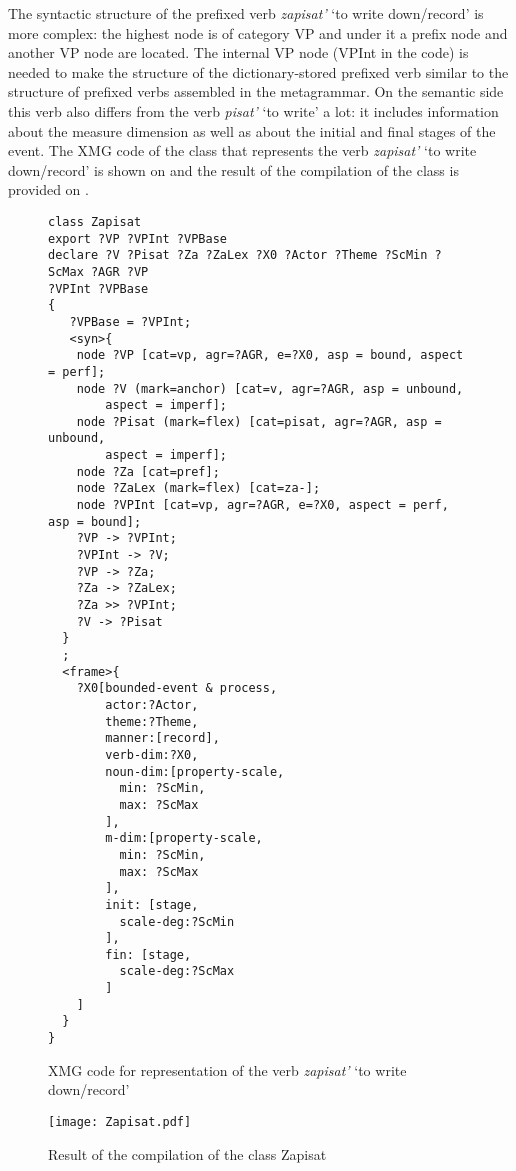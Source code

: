The syntactic structure of the prefixed verb \textit{zapisat'} `to write down/record' is more complex: the highest node is of category VP and under it a prefix node and another VP node are located. The internal VP node (VPInt in the code) is needed to make the structure of the dictionary-stored prefixed verb similar to the structure of prefixed verbs assembled in the metagrammar. On the semantic side this verb also differs from the verb \textit{pisat'} `to write' a lot: it includes information about the measure dimension as well as about the initial and final stages of the event. The XMG code of the class that represents the verb \textit{zapisat'} `to write down/record' is shown on  and the result of the compilation of the class is provided on .
 
 \begin{figure}\small
\begin{verbatim}
class Zapisat
export ?VP ?VPInt ?VPBase
declare ?V ?Pisat ?Za ?ZaLex ?X0 ?Actor ?Theme ?ScMin ?ScMax ?AGR ?VP 
?VPInt ?VPBase
{
   ?VPBase = ?VPInt;
   <syn>{
    node ?VP [cat=vp, agr=?AGR, e=?X0, asp = bound, aspect = perf];
    node ?V (mark=anchor) [cat=v, agr=?AGR, asp = unbound, 
    	aspect = imperf];
    node ?Pisat (mark=flex) [cat=pisat, agr=?AGR, asp = unbound, 
    	aspect = imperf];
    node ?Za [cat=pref];
    node ?ZaLex (mark=flex) [cat=za-];
    node ?VPInt [cat=vp, agr=?AGR, e=?X0, aspect = perf, asp = bound];
    ?VP -> ?VPInt;
    ?VPInt -> ?V;
    ?VP -> ?Za;
    ?Za -> ?ZaLex;
    ?Za >> ?VPInt;
    ?V -> ?Pisat
  }
  ;
  <frame>{
    ?X0[bounded-event & process,
        actor:?Actor,
        theme:?Theme,
        manner:[record],
        verb-dim:?X0,
        noun-dim:[property-scale,
          min: ?ScMin,
          max: ?ScMax
        ],
        m-dim:[property-scale,
          min: ?ScMin,
          max: ?ScMax
        ],
        init: [stage, 
          scale-deg:?ScMin
        ],
        fin: [stage, 
          scale-deg:?ScMax
        ]
    ]
  }
}

\end{verbatim}
\caption{XMG code for representation of the verb \textit{zapisat'} `to write down/record' \label{xmg:zapisat}}
\end{figure}

\begin{figure}
\texttt{[image: Zapisat.pdf]}
\caption{Result of the compilation of the class Zapisat \label{fig:zapisat}}
\end{figure}

